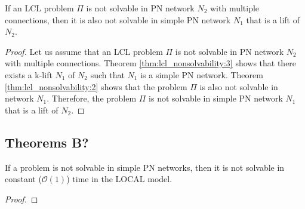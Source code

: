 

%
\begin{theorem} \label{thm:lcl_nonsolvability:4}
    If an LCL problem $\Pi$ is not solvable in PN network $N_2$ with multiple connections, then it is also not solvable in simple PN network $N_1$ that is a lift of $N_2$.
\end{theorem}
\begin{proof}
    Let us assume that an LCL problem $\Pi$ is not solvable in PN network $N_2$ with multiple connections.
    Theorem \ref{thm:lcl_nonsolvability:3} shows that there exists a k-lift $N_1$ of $N_2$ such that $N_1$ is a simple PN network.
    Theorem \ref{thm:lcl_nonsolvability:2} shows that the problem $\Pi$ is also not solvable in network $N_1$.
    Therefore, the problem $\Pi$ is not solvable in simple PN network $N_1$ that is a lift of $N_2$.
\end{proof}

\subsection{Theorems B?} \label{sec:algorithm:theorems:b}

\begin{theorem} \label{thm:lcl_nonsolvability:5}
    If a problem is not solvable in simple PN networks, then it is not solvable in constant ($\mathcal{O}(1)$) time in the LOCAL model.
\end{theorem}
\begin{proof}
\end{proof}
